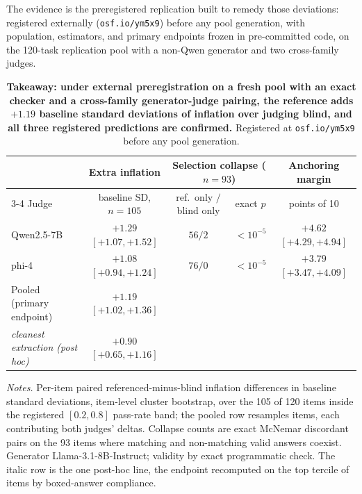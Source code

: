 \documentclass[11pt]{article}
\begin{document}
The evidence is the preregistered replication built to remedy those deviations: registered externally (\texttt{osf.io/ym5x9}) before any pool generation, with population, estimators, and primary endpoints frozen in pre-committed code, on the 120-task replication pool with a non-Qwen generator and two cross-family judges.

\begin{table}[tbp]
\centering
\small
\setlength{\tabcolsep}{4pt}
\begin{tabular}{lcccc}
\toprule
& Extra inflation & \multicolumn{2}{c}{Selection collapse ($n{=}93$)} & Anchoring margin \\
\cmidrule(lr){3-4}
Judge & baseline SD, $n{=}105$ & ref.\ only $/$ blind only & exact $p$ & points of 10 \\
\midrule
Qwen2.5-7B & $+1.29$ {\scriptsize$[+1.07, +1.52]$} & $56/2$ & $<10^{-5}$ & $+4.62$ {\scriptsize$[+4.29, +4.94]$} \\
phi-4      & $+1.08$ {\scriptsize$[+0.94, +1.24]$} & $76/0$ & $<10^{-5}$ & $+3.79$ {\scriptsize$[+3.47, +4.09]$} \\
Pooled (primary endpoint) & $\mathbf{+1.19}$ {\scriptsize$[+1.02, +1.36]$} & & & \\
\addlinespace[2pt]
\emph{\quad cleanest extraction (post hoc)} & $+0.90$ {\scriptsize$[+0.65, +1.16]$} & & & \\
\bottomrule
\end{tabular}

\medskip
\begin{minipage}{0.97\textwidth}
\footnotesize
\emph{Notes.}
Per-item paired referenced-minus-blind inflation differences in baseline standard deviations, item-level cluster bootstrap, over the 105 of 120 items inside the registered $[0.2, 0.8]$ pass-rate band; the pooled row resamples items, each contributing both judges' deltas. Collapse counts are exact McNemar discordant pairs on the 93 items where matching and non-matching valid answers coexist. Generator Llama-3.1-8B-Instruct; validity by exact programmatic check. The italic row is the one post-hoc line, the endpoint recomputed on the top tercile of items by boxed-answer compliance.
\end{minipage}
\caption{\textbf{Takeaway: under external preregistration on a fresh pool with an exact checker and a cross-family generator-judge pairing, the reference adds $+1.19$ baseline standard deviations of inflation over judging blind, and all three registered predictions are confirmed.}
Registered at \texttt{osf.io/ym5x9} before any pool generation.}
\label{tab:repl}
\end{table}
\end{document}
